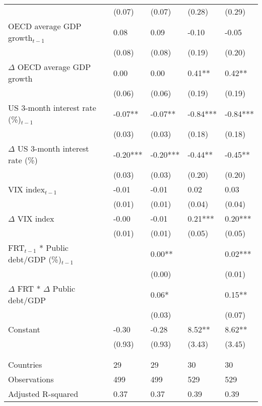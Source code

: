 \begin{tabular}{lp{3cm}p{3cm}p{3cm}p{3cm}}
   & (0.07) & (0.07) & (0.28) & (0.29) \\ 
  OECD average GDP growth$_{t-1}$ & 0.08 & 0.09 & -0.10 & -0.05 \\ 
   & (0.08) & (0.08) & (0.19) & (0.20) \\ 
  $\Delta$ OECD average GDP growth & 0.00 & 0.00 & 0.41** & 0.42** \\ 
   & (0.06) & (0.06) & (0.19) & (0.19) \\ 
  US 3-month interest rate (\%)$_{t-1}$ & -0.07** & -0.07** & -0.84*** & -0.84*** \\ 
   & (0.03) & (0.03) & (0.18) & (0.18) \\ 
  $\Delta$ US 3-month interest rate (\%) & -0.20*** & -0.20*** & -0.44** & -0.45** \\ 
   & (0.03) & (0.03) & (0.20) & (0.20) \\ 
  VIX index$_{t-1}$ & -0.01 & -0.01 & 0.02 & 0.03 \\ 
   & (0.01) & (0.01) & (0.04) & (0.04) \\ 
  $\Delta$ VIX index & -0.00 & -0.01 & 0.21*** & 0.20*** \\ 
   & (0.01) & (0.01) & (0.05) & (0.05) \\ 
  FRT$_{t-1}$ * Public debt/GDP (\%)$_{t-1}$ &  & 0.00** &  & 0.02*** \\ 
   &  & (0.00) &  & (0.01) \\ 
  $\Delta$ FRT * $\Delta$ Public debt/GDP &  & 0.06* &  & 0.15** \\ 
   &  & (0.03) &  & (0.07) \\ 
  Constant & -0.30 & -0.28 & 8.52** & 8.62** \\ 
   & (0.93) & (0.93) & (3.43) & (3.45) \\ 
   &  &  &  &  \\ 
   &  &  &  &  \\ 
  Countries & 29 & 29 & 30 & 30 \\ 
  Observations & 499 & 499 & 529 & 529 \\ 
  Adjusted R-squared & 0.37 & 0.37 & 0.39 & 0.39 \\ 
   \hline
\end{tabular}
\endgroup
